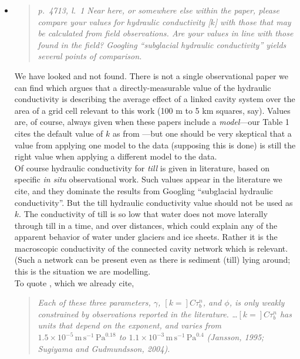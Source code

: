 \documentclass[11pt,reqno]{amsart}
\newcommand{\reply}[2]{
\medskip\medskip
\item  \begin{quote}
\emph{#1}
\end{quote}

\medskip
\noindent #2}
\begin{document}
\begin{itemize}
\reply{p.~4713, l.~1 Near here, or somewhere else within the paper, please compare your
values for hydraulic conductivity [$k$] with those that may be calculated from field observations. Are your values in line with those found in the field? Googling ``subglacial
hydraulic conductivity'' yields several points of comparison.}
{We have looked and not found.  There is not a single observational paper we can find which argues that a directly-measurable value of the hydraulic conductivity is describing the average effect of a linked cavity system over the area of a grid cell relevant to this work (100 m to 5 km squares, say).  Values are, of course, always given when these papers include a \emph{model}---our Table 1 cites the default value of $k$ as from \cite{Schoofetal2012}---but one should be very skeptical that a value from applying one model to the data (supposing this is done) is still the right value when applying a different model to the data. \\
\indent Of course hydraulic conductivity for \emph{till} is given in literature, based on specific \emph{in situ} observational work.  Such values appear in the literature we cite, and they dominate the results from Googling ``subglacial hydraulic conductivity''.  But the till hydraulic conductivity value should not be used as $k$.  The conductivity of till is so low that water does not move laterally through till in a time, and over distances, which could explain any of the apparent behavior of water under glaciers and ice sheets.  Rather it is the macroscopic conductivity of the connected cavity network which is relevant.  (Such a network can be present even as there is sediment (till) lying around; this is the situation we are modelling. \\
\indent  To quote \cite{Bartholomausetal2011}, which we already cite, \begin{quote}
\emph{Each of these three parameters, $\gamma$, $[k=]C\tau_b^n$, and $\phi$, is only weakly constrained by observations reported in the literature.  \dots $[k=]C\tau_b^n$ has units that depend on the exponent, and varies from $1.5\times 10^{-5}\, \text{m}\,\text{s}^{-1}\,\text{Pa}^{0.18}$ to $1.1\times 10^{-3}\, \text{m}\,\text{s}^{-1}\,\text{Pa}^{0.4}$ (Jansson, 1995; Sugiyama and Gudmundsson, 2004).}
\end{quote}
}
\end{itemize}
\end{document}
